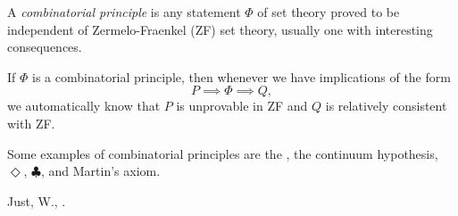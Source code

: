 \documentclass[12pt]{article}
\begin{document}
A \emph{combinatorial principle} is any statement $\Phi$ of set theory proved to be independent of Zermelo-Fraenkel (ZF) set theory, usually one with interesting consequences.

If $\Phi$ is a combinatorial principle, then whenever we have implications 
of the form
\[P\implies \Phi\implies Q,\]
we automatically know that $P$ is unprovable in ZF and $Q$ is relatively consistent with ZF.

Some examples of combinatorial principles are the , the continuum hypothesis, $\Diamond$, $\clubsuit$, and Martin's axiom.  

\begin{thebibliography}{9}
Just, W., .
\end{thebibliography}
\end{document}
